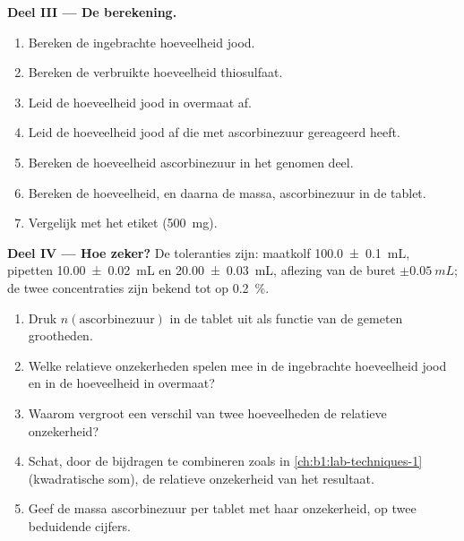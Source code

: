 \begin{problem}
\medskip
\noindent\textbf{Deel III --- De berekening.}
\begin{enumerate}[resume]
  \item Bereken de ingebrachte hoeveelheid jood.
  \item Bereken de verbruikte hoeveelheid thiosulfaat.
  \item Leid de hoeveelheid jood in overmaat af.
  \item Leid de hoeveelheid jood af die met ascorbinezuur gereageerd
        heeft.
  \item Bereken de hoeveelheid ascorbinezuur in het genomen deel.
  \item Bereken de hoeveelheid, en daarna de massa, ascorbinezuur in de
        tablet.
  \item Vergelijk met het etiket (\qty{500}{mg}).
\end{enumerate}

\medskip
\noindent\textbf{Deel IV --- Hoe zeker?}
De toleranties zijn: maatkolf \qty{100.0 \pm 0.1}{mL}, pipetten
\qty{10.00 \pm 0.02}{mL} en \qty{20.00 \pm 0.03}{mL}, aflezing van de
buret $\pm\qty{0.05}{mL}$; de twee concentraties zijn bekend tot op
\qty{0.2}{\percent}.
\begin{enumerate}[resume]
  \item Druk $n(\text{ascorbinezuur})$ in de tablet uit als functie van
        de gemeten grootheden.
  \item Welke relatieve onzekerheden spelen mee in de ingebrachte
        hoeveelheid jood en in de hoeveelheid in overmaat?
  \item Waarom vergroot een verschil van twee hoeveelheden de relatieve
        onzekerheid?
  \item Schat, door de bijdragen te combineren zoals in
        \cref{ch:b1:lab-techniques-1} (kwadratische som), de relatieve
        onzekerheid van het resultaat.
  \item Geef de massa ascorbinezuur per tablet met haar onzekerheid, op
        twee beduidende cijfers.
\end{enumerate}
\end{problem}

